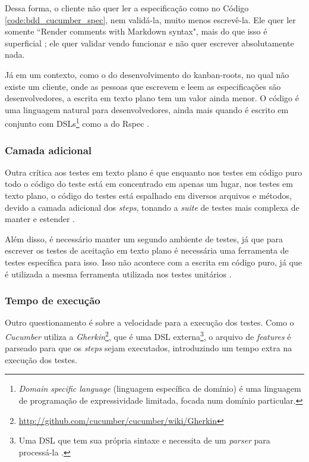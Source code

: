 Dessa forma, o cliente não quer ler a especificação como no Código \ref{code:bdd_cucumber_spec}, nem validá-la, muito menos escrevê-la. Ele quer ler somente ``Render comments with Markdown syntax", mais do que isso é superficial \cite{WhyBotherWithCucumberTesting}; ele quer validar vendo funcionar e não quer escrever absolutamente nada.

Já em um contexto, como o do desenvolvimento do kanban-roots, no qual não existe um cliente, onde as pessoas que escrevem e leem as especificações são desenvolvedores, a escrita em texto plano tem um valor ainda menor. O código é uma linguagem natural para desenvolvedores, ainda mais quando é escrito em conjunto com DSLs\footnote{\textit{Domain specific language} (linguagem específica de domínio) é uma linguagem de programação de expressividade limitada, focada num domínio particular.} como a do Rspec \cite{SteakOverCucumber}.


\subsubsection{Camada adicional} %
\label{subsub:camada_adicional}

Outra crítica aos testes em texto plano é que enquanto nos testes em código puro todo o código do teste está em concentrado em apenas um lugar, nos testes em texto plano, o código do testes está espalhado em diversos arquivos e métodos, devido a camada adicional dos \textit{steps}, tonando a \textit{suite} de testes mais complexa de manter e estender \cite{SteakOverCucumber}.

Além disso, é necessário manter um segundo ambiente de testes, já que para escrever os testes de aceitação em texto plano é necessária uma ferramenta de testes específica para isso. Isso não acontece com a escrita em código puro, já que é utilizada a mesma ferramenta utilizada nos testes unitários \cite{WhyBotherWithCucumberTesting}.


\subsubsection{Tempo de execução} %
\label{subsub:tempo_de_execucao}

Outro questionamento é sobre a velocidade para a execução dos testes. Como o \textit{Cucumber} utiliza a \textit{Gherkin}\footnote{\url{http://github.com/cucumber/cucumber/wiki/Gherkin}}, que é uma DSL externa\footnote{Uma DSL que tem sua própria sintaxe e necessita de um \textit{parser} para processá-la \cite{DSLFowler}.}, o arquivo de \textit{features} é parseado para que os \textit{steps} sejam executados, introduzindo um tempo extra na execução dos testes.

